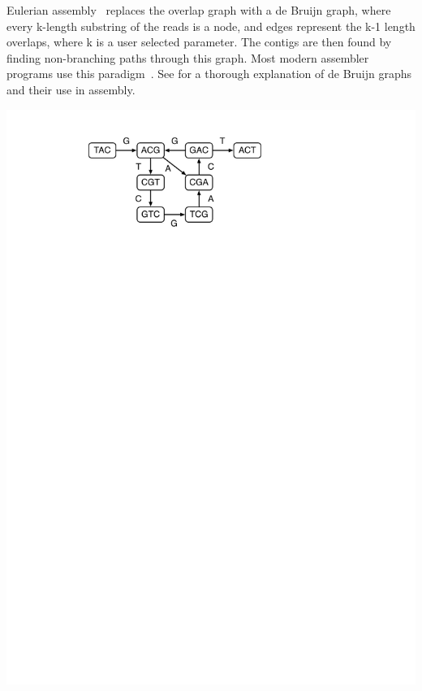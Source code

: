 Eulerian assembly~\cite{IW95, PTW} replaces the overlap graph with a de Bruijn graph, where every k-length substring of the reads is a node, and edges represent the k-1 length overlaps, where k is a user selected parameter. The contigs are then found by finding non-branching paths through this graph. Most modern assembler programs use this paradigm~\cite{bankevich2012spades,peng2010idba,Li:2010,Simpson:2009,Butler:2008,Zerbino:2008,SahShi12,MacPrz09}. See \cite{compeau11} for a thorough explanation of de Bruijn graphs and their use in assembly.

\includegraphics*[width=100ex]{images/graph-nodummies.pdf}
